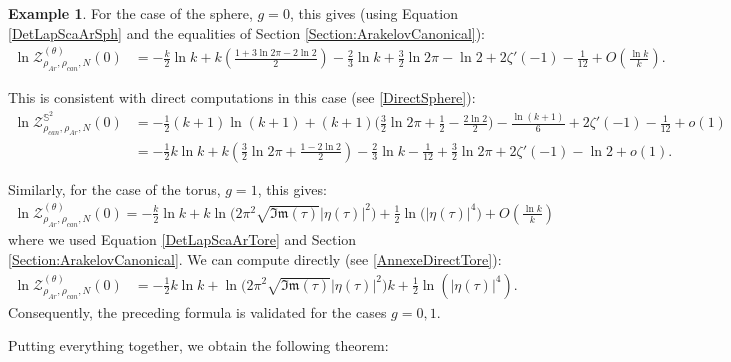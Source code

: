 \documentclass{article}
\theoremstyle{definition}
\newtheorem{Example}[theorem]{Example}
\theoremstyle{remark}
\begin{document}
\begin{Example}
For the case of the sphere, $g=0$, this gives (using Equation \eqref{DetLapScaArSph} and the equalities of Section \ref{Section:ArakelovCanonical}): 
\begin{align*}
    \ln \mathcal{Z}_{\rho_{Ar},\rho_{can},N}^{(\theta)}(0)&=-\frac{k}{2}\ln k+k\left(\frac{1+3\ln2\pi-2\ln2}{2} \right)-\frac{2}{3}\ln k+\frac{3}{2}\ln2\pi-\ln2+2\zeta'(-1)-\frac{1}{12}+ O\left(\frac{\ln k}{k} \right).
\end{align*}


This is consistent with direct computations in this case (see \ref{DirectSphere}): 
\begin{align*}
    \ln \mathcal{Z}^{\mathbb{S}^{2}}_{\rho_{can},\rho_{Ar},N}(0)&=-\frac{1}{2}(k+1)\ln(k+1)+(k+1)\bigg(\frac{3}{2}\ln2\pi +\frac{1}{2}-\frac{2\ln2}{2}\bigg) -\frac{\ln(k+1)}{6}+2\zeta'(-1)-\frac{1}{12}+o(1)  \\&=-\frac{1}{2}k\ln k+k\left(\frac{3}{2}\ln2\pi+\frac{1-2\ln2}{2} \right)-\frac{2}{3}\ln k-\frac{1}{12}+\frac{3}{2}\ln2\pi +2\zeta'(-1)-\ln2+o(1).
\end{align*}

Similarly, for the case of the torus, $g=1$, this gives: 
\begin{align*}
    \ln \mathcal{Z}_{\rho_{Ar},\rho_{can},N}^{(\theta)}(0)=-\frac{k}{2}\ln k+k\ln\Big(2\pi^{2} \sqrt{\mathfrak{Im}(\tau)}|\eta(\tau)|^{2}\Big)+\frac{1}{2}\ln \big(|\eta(\tau)|^{4}\big)+O\left(\frac{\ln k}{k} \right)
\end{align*}
where we used Equation \eqref{DetLapScaArTore} and Section \ref{Section:ArakelovCanonical}. We can compute directly (see \ref{AnnexeDirectTore}):
\begin{align*}
    \ln \mathcal{Z}_{\rho_{Ar},\rho_{can},N}^{(\theta)}(0)&=-\frac{1}{2}k\ln k+\ln\big(2\pi^{2}\sqrt{\mathfrak{Im}(\tau)}|\eta(\tau)|^{2} \big)k  +\frac{1}{2}\ln(|\eta(\tau)|^{4}).
\end{align*}
Consequently, the preceding formula is validated for the cases $g=0,1$.
\end{Example}
Putting everything together, we obtain the following theorem: 
\end{document}
